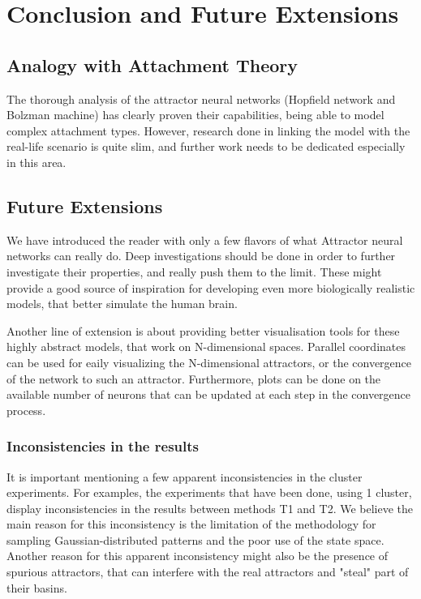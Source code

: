 \chapter{Conclusion and Future Extensions}

\section{Analogy with Attachment Theory}

The thorough analysis of the attractor neural networks (Hopfield network and Bolzman machine) has clearly proven their capabilities, being able to model complex attachment types. However, research done in linking the model with the real-life scenario is quite slim, and further work needs to be dedicated especially in this area. 

\section{Future Extensions}

We have introduced the reader with only a few flavors of what Attractor neural networks can really do. Deep investigations should be done in order to further investigate their properties, and really push them to the limit. These might provide a good source of inspiration for developing even more biologically realistic models, that better simulate the human brain.

Another line of extension is about providing better visualisation tools for these highly abstract models, that work on N-dimensional spaces. Parallel coordinates can be used for eaily visualizing the N-dimensional attractors, or the convergence of the network to such an attractor. Furthermore, plots can be done on the available number of neurons that can be updated at each step in the convergence process. 

\subsection{Inconsistencies in the results}
\label{inconsistencies}

It is important mentioning a few apparent inconsistencies in the cluster experiments. For examples, the experiments that have been done, using 1 cluster, display inconsistencies in the results between methods T1 and T2. We believe the main reason for this inconsistency is the limitation of the methodology for sampling Gaussian-distributed patterns and the poor use of the state space. Another reason for this apparent inconsistency might also be the presence of spurious attractors, that can interfere with the real attractors and "steal" part of their basins.